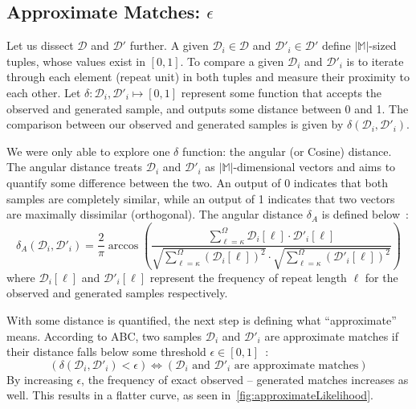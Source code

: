 \subsection{Approximate Matches: $\epsilon$}\label{subsec:approximateMatches}
Let us dissect $\mathcal{D}$ and $\mathcal{D}'$ further.
A given $\mathcal{D}_i \in \mathcal{D}$ and $\mathcal{D}'_i \in \mathcal{D}'$ define $| \mathbb{M} |$-sized tuples,
whose values exist in $[0, 1]$.
To compare a given $\mathcal{D}_i$ and $\mathcal{D}'_i$ is to iterate through each element (repeat unit) in both
tuples and measure their proximity to each other.
Let $\delta : \mathcal{D}_i,\mathcal{D}'_i \mapsto [0, 1]$ represent some function that accepts the observed and
generated sample, and outputs some distance between 0 and 1.
The comparison between our observed and generated samples is given by $\delta(\mathcal{D}_i, \mathcal{D}'_i)$.

We were only able to explore one $\delta$ function: the angular (or Cosine) distance.
The angular distance treats $\mathcal{D}_i$ and $\mathcal{D}'_i$ as $| \mathbb{M} |$-dimensional vectors
and aims to quantify some difference between the two.
An output of 0 indicates that both samples are completely similar, while an output of 1 indicates that two vectors
are maximally dissimilar (orthogonal).
The angular distance $\delta_A$ is defined below~\cite{chaComprehensiveSurveyDistance2007a}:
\begin{equation}
    \delta_A(\mathcal{D}_i, \mathcal{D}'_i) = \frac{2}{\pi} \arccos \left(
    \frac{\sum_{\ell=\kappa}^{\Omega} \mathcal{D}_i[\ell] \cdot \mathcal{D}'_i[\ell]}{
        \sqrt{\sum_{\ell=\kappa}^{\Omega} \left(\mathcal{D}_i[\ell]\right)^2} \cdot
        \sqrt{\sum_{\ell=\kappa}^{\Omega} \left(\mathcal{D}'_i[\ell]\right)^2}
    } \right)
\end{equation}
where $\mathcal{D}_i[\ell]$ and $\mathcal{D}'_i[\ell]$ represent the frequency of repeat length $\ell$ for the observed
and generated samples respectively.

With some distance is quantified, the next step is defining what ``approximate'' means.
According to ABC, two samples $\mathcal{D}_i$ and $\mathcal{D}'_i$ are approximate matches if their distance falls below
some threshold $\epsilon \in [0, 1]$~\cite{marjoramMarkovChainMonte2003}:
\begin{equation}
    \left(\delta(\mathcal{D}_i, \mathcal{D}'_i) < \epsilon \right) \Leftrightarrow
    \left(\mathcal{D}_i \text { and } \mathcal{D}'_i
    \text{ are approximate matches} \right)
\end{equation}
By increasing $\epsilon$, the frequency of exact observed -- generated matches increases as well.
This results in a flatter curve, as seen in~\autoref{fig:approximateLikelihood}.

